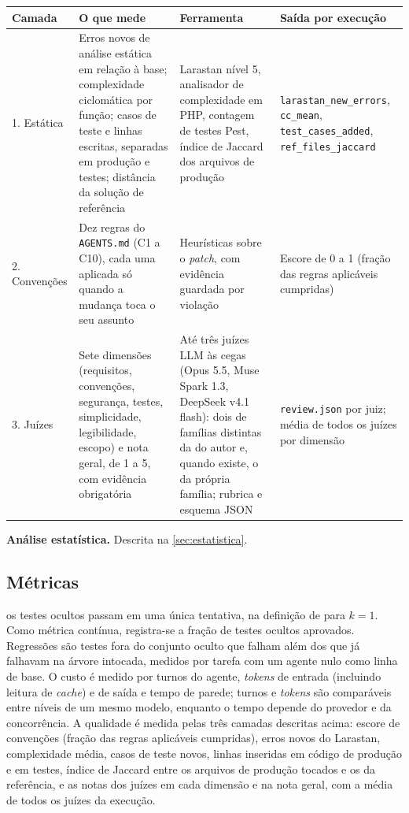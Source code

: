 \begin{quadro}[htb]
    \centering
    \ABNTEXfontereduzida
    \caption{\label{qdr:camadas}As três camadas da análise de qualidade de código}
    \begin{tabular}{|l|p{4.6cm}|p{3.4cm}|p{4.2cm}|}
        \hline
        \textbf{Camada} & \textbf{O que mede} & \textbf{Ferramenta} & \textbf{Saída por execução} \\
        \hline
        1. Estática & Erros novos de análise estática em relação à base; complexidade ciclomática por função; casos de teste e linhas escritas, separadas em produção e testes; distância da solução de referência & Larastan nível 5, analisador de complexidade em PHP, contagem de testes Pest, índice de Jaccard dos arquivos de produção & \texttt{larastan\_new\_errors}, \texttt{cc\_mean}, \texttt{test\_cases\_added}, \texttt{ref\_files\_jaccard} \\
        \hline
        2. Convenções & Dez regras do \texttt{AGENTS.md} (C1 a C10), cada uma aplicada só quando a mudança toca o seu assunto & Heurísticas sobre o \textit{patch}, com evidência guardada por violação & Escore de 0 a 1 (fração das regras aplicáveis cumpridas) \\
        \hline
        3. Juízes & Sete dimensões (requisitos, convenções, segurança, testes, simplicidade, legibilidade, escopo) e nota geral, de 1 a 5, com evidência obrigatória & Até três juízes LLM às cegas (Opus 5.5, Muse Spark 1.3, DeepSeek v4.1 flash): dois de famílias distintas da do autor e, quando existe, o da própria família; rubrica e esquema JSON & \texttt{review.json} por juiz; média de todos os juízes por dimensão \\
        \hline
    \end{tabular}
    \fonteautor
\end{quadro}

\textbf{Análise estatística.} Descrita na \autoref{sec:estatistica}.

\subsection{Métricas}
\label{sec:metricas}

os testes ocultos passam em uma única tentativa, na definição de
 para $k = 1$. Como métrica contínua, registra-se a
fração de testes ocultos aprovados. Regressões são testes fora do conjunto
oculto que falham além dos que já falhavam na árvore intocada, medidos por
tarefa com um agente nulo como linha de base. O custo é medido por turnos do
agente, \textit{tokens} de entrada (incluindo leitura de \textit{cache}) e de
saída e tempo de parede; turnos e \textit{tokens} são comparáveis entre níveis
de um mesmo modelo, enquanto o tempo depende do provedor e da concorrência. A
qualidade é medida pelas três camadas descritas acima: escore de convenções
(fração das regras aplicáveis cumpridas), erros novos do Larastan,
complexidade média, casos de teste novos, linhas inseridas em código de
produção e em testes, índice de Jaccard entre os arquivos
de produção tocados e os da referência, e as notas dos juízes em cada dimensão
e na nota geral, com a média de todos os juízes da execução.

